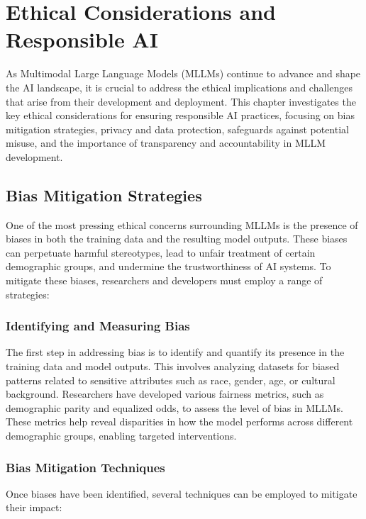 \chapter{Ethical Considerations and Responsible AI}

As Multimodal Large Language Models (MLLMs) continue to advance and shape the AI landscape, it is crucial to address the ethical implications and challenges that arise from their development and deployment. This chapter investigates the key ethical considerations for ensuring responsible AI practices, focusing on bias mitigation strategies, privacy and data protection, safeguards against potential misuse, and the importance of transparency and accountability in MLLM development.

\section{Bias Mitigation Strategies}

One of the most pressing ethical concerns surrounding MLLMs is the presence of biases in both the training data and the resulting model outputs. These biases can perpetuate harmful stereotypes, lead to unfair treatment of certain demographic groups, and undermine the trustworthiness of AI systems. To mitigate these biases, researchers and developers must employ a range of strategies:

\subsection{Identifying and Measuring Bias}

The first step in addressing bias is to identify and quantify its presence in the training data and model outputs. This involves analyzing datasets for biased patterns related to sensitive attributes such as race, gender, age, or cultural background. Researchers have developed various fairness metrics, such as demographic parity and equalized odds, to assess the level of bias in MLLMs. These metrics help reveal disparities in how the model performs across different demographic groups, enabling targeted interventions.

\subsection{Bias Mitigation Techniques}

Once biases have been identified, several techniques can be employed to mitigate their impact:

